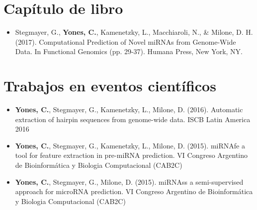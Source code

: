\section*{Capítulo de libro}
\begin{itemize}
	\item Stegmayer, G., \textbf{Yones, C.}, Kamenetzky, L., Macchiaroli, N., \& Milone, D. H. (2017). Computational Prediction of Novel miRNAs from Genome-Wide Data. In Functional Genomics (pp. 29-37). Humana Press, New York, NY.
\end{itemize}

\section*{Trabajos en eventos científicos}
\begin{itemize}
	\item \textbf{Yones, C.}, Stegmayer, G., Kamenetzky, L., Milone, D. (2016). Automatic extraction of hairpin sequences from genome-wide data. ISCB Latin America 2016
	\item \textbf{Yones, C.}, Stegmayer, G., Kamenetzky, L., Milone, D. (2015). miRNAfe a tool for feature extraction in pre-miRNA prediction. VI Congreso Argentino de Bioinformática y Biologia Computacional (CAB2C)
	\item \textbf{Yones, C.}, Stegmayer, G., Milone, D. (2015). miRNAss a semi-supervised approach for microRNA prediction. VI Congreso Argentino de Bioinformática y Biologia Computacional (CAB2C)
\end{itemize}
